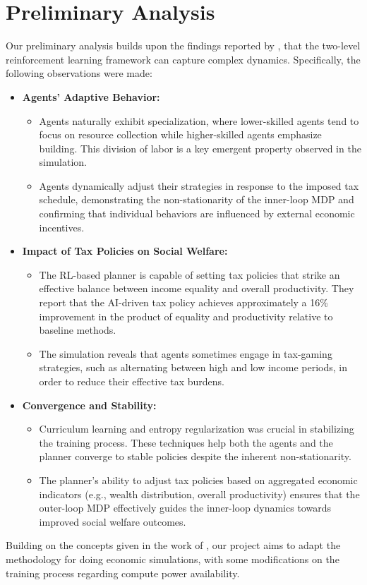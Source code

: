 \section{Preliminary Analysis}

Our preliminary analysis builds upon the findings reported by \cite{zheng_2020_aieconomist}, that the two-level reinforcement learning framework can capture complex dynamics. Specifically, the following observations were made:

\begin{itemize}
    \item \textbf{Agents' Adaptive Behavior:}
    \begin{itemize}
        \item  Agents naturally exhibit specialization, where lower-skilled agents tend to focus on resource collection while higher-skilled agents emphasize building. This division of labor is a key emergent property observed in the simulation.
        \item  Agents dynamically adjust their strategies in response to the imposed tax schedule, demonstrating the non-stationarity of the inner-loop MDP and confirming that individual behaviors are influenced by external economic incentives.
    \end{itemize}
    
    \item \textbf{Impact of Tax Policies on Social Welfare:}
    \begin{itemize}
        \item The RL-based planner is capable of setting tax policies that strike an effective balance between income equality and overall productivity. They report that the AI-driven tax policy achieves approximately a 16\% improvement in the product of equality and productivity relative to baseline methods.
        \item The simulation reveals that agents sometimes engage in tax-gaming strategies, such as alternating between high and low income periods, in order to reduce their effective tax burdens.
    \end{itemize}
    
    \item \textbf{Convergence and Stability:}
    \begin{itemize}
        \item  Curriculum learning and entropy regularization was crucial in stabilizing the training process. These techniques help both the agents and the planner converge to stable policies despite the inherent non-stationarity.
        \item The planner's ability to adjust tax policies based on aggregated economic indicators (e.g., wealth distribution, overall productivity) ensures that the outer-loop MDP effectively guides the inner-loop dynamics towards improved social welfare outcomes.
    \end{itemize}
\end{itemize}

Building on the concepts given in the work of \cite{zheng_2020_aieconomist}, our project aims to adapt the methodology for doing economic simulations, with some modifications on the training process regarding compute power availability.
